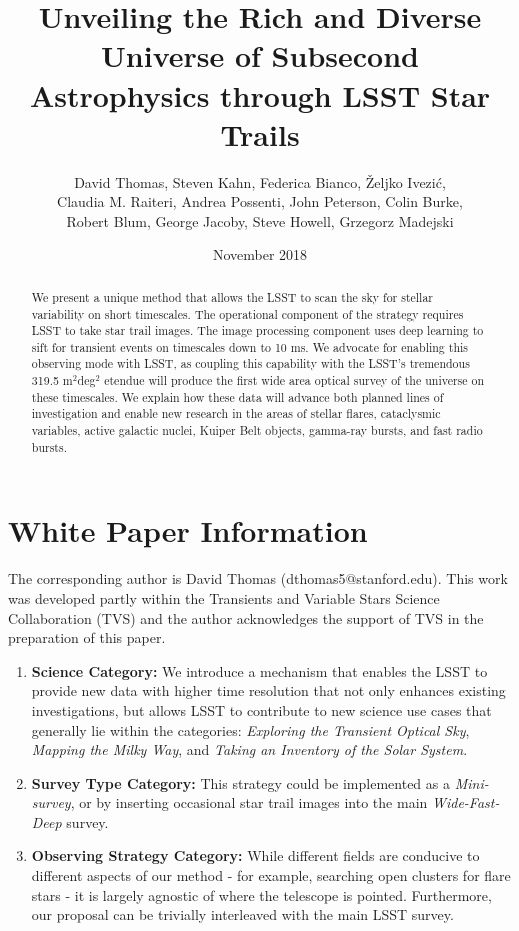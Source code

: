 \documentclass[12pt, letterpaper]{article}
\title{Unveiling the Rich and Diverse Universe of Subsecond Astrophysics through LSST Star Trails}
\author{David Thomas, Steven Kahn, Federica Bianco, Željko Ivezić, \\
Claudia M. Raiteri, Andrea Possenti, John Peterson, Colin Burke, \\Robert Blum, George Jacoby, Steve Howell, Grzegorz Madejski}
\date{November 2018}
\begin{document}
\maketitle

\begin{abstract}
We present a unique method that allows the LSST to scan the sky for stellar variability on short timescales.
The operational component of the strategy requires LSST to take star trail images. The image processing component uses deep learning to sift for transient events on timescales down to 10 ms. We advocate for enabling this observing mode with LSST, as coupling this capability with the LSST's tremendous 319.5 m$^2$deg$^2$ etendue will produce the first wide area optical survey of the universe on these timescales. We explain how these data will advance both planned lines of investigation and enable new research in the areas of stellar flares, cataclysmic variables, active galactic nuclei, Kuiper Belt objects, gamma-ray bursts, and fast radio bursts.
\end{abstract}

\section{White Paper Information}
The corresponding author is David Thomas (dthomas5@stanford.edu). This work was developed partly within the Transients and Variable Stars Science Collaboration (TVS) and the author acknowledges the support of TVS in the preparation of this paper.

\begin{enumerate} 
\item {\bf Science Category:} We introduce a mechanism that enables the LSST to provide new data with higher time resolution that not only enhances existing investigations, but allows LSST to contribute to new science use cases that generally lie within the categories: \textit{Exploring the Transient Optical Sky}, \textit{Mapping the Milky Way}, and \textit{Taking an Inventory of the Solar System}.

\item {\bf Survey Type Category:} This strategy could be implemented as a \emph{Mini-survey}, or by inserting occasional star trail images into the main \textit{Wide-Fast-Deep} survey.

\item {\bf Observing Strategy Category:}
While different fields are conducive to different aspects of our method - for example, searching open clusters for flare stars - it is largely agnostic of where the telescope is pointed. Furthermore, our proposal can be trivially interleaved with the main LSST survey.

\end{enumerate}  
\end{document}
